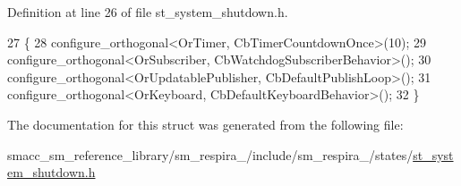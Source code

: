 Definition at line 26 of file st\+\_\+system\+\_\+shutdown.\+h.


\begin{DoxyCode}
27     \{
28         configure\_orthogonal<OrTimer, CbTimerCountdownOnce>(10);
29         configure\_orthogonal<OrSubscriber, CbWatchdogSubscriberBehavior>();
30         configure\_orthogonal<OrUpdatablePublisher, CbDefaultPublishLoop>();
31         configure\_orthogonal<OrKeyboard, CbDefaultKeyboardBehavior>();
32     \}
\end{DoxyCode}


The documentation for this struct was generated from the following file\+:\begin{DoxyCompactItemize}
\item 
smacc\+\_\+sm\+\_\+reference\+\_\+library/sm\+\_\+respira\+\_/include/sm\+\_\+respira\+\_/states/\hyperlink{st__system__shutdown_8h}{st\+\_\+system\+\_\+shutdown.\+h}\end{DoxyCompactItemize}
